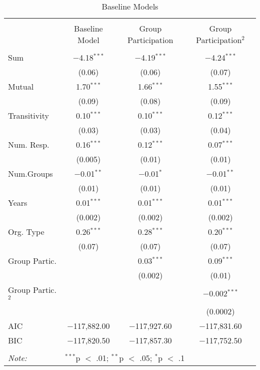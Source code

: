 
\begin{table}[!htbp] \centering 
  \caption{Baseline Models} 
  \label{table:basemods} 
\begin{tabular}{@{\extracolsep{5pt}}lccc} 
\\[-1.8ex]\hline \\[-1.8ex] 
 & Baseline Model & Group Participation & Group Participation$^2$ \\ 
\hline \\[-1.8ex] 
 Sum & $-$4.18$^{***}$ & $-$4.19$^{***}$ & $-$4.24$^{***}$ \\ 
  & (0.06) & (0.06) & (0.07) \\ 
  Mutual & 1.70$^{***}$ & 1.66$^{***}$ & 1.55$^{***}$ \\ 
  & (0.09) & (0.08) & (0.09) \\ 
  Transitivity & 0.10$^{***}$ & 0.10$^{***}$ & 0.12$^{***}$ \\ 
  & (0.03) & (0.03) & (0.04) \\ 
  Num. Resp. & 0.16$^{***}$ & 0.12$^{***}$ & 0.07$^{***}$ \\ 
  & (0.005) & (0.01) & (0.01) \\ 
  Num.Groups & $-$0.01$^{**}$ & $-$0.01$^{*}$ & $-$0.01$^{**}$ \\ 
  & (0.01) & (0.01) & (0.01) \\ 
  Years & 0.01$^{***}$ & 0.01$^{***}$ & 0.01$^{***}$ \\ 
  & (0.002) & (0.002) & (0.002) \\ 
  Org. Type & 0.26$^{***}$ & 0.28$^{***}$ & 0.20$^{***}$ \\ 
  & (0.07) & (0.07) & (0.07) \\ 
  Group Partic. &  & 0.03$^{***}$ & 0.09$^{***}$ \\ 
  &  & (0.002) & (0.01) \\ 
  Group Partic.$^2$ &  &  & $-$0.002$^{***}$ \\ 
  &  &  & (0.0002) \\ 
 AIC & $-$117,882.00 & $-$117,927.60 & $-$117,831.60 \\ 
BIC & $-$117,820.50 & $-$117,857.30 & $-$117,752.50 \\ 
\hline \\[-1.8ex] 
\textit{Note:} & \multicolumn{3}{l}{$^{***}$p $<$ .01; $^{**}$p $<$ .05; $^{*}$p $<$ .1} \\ 
\end{tabular} 
\end{table} 
